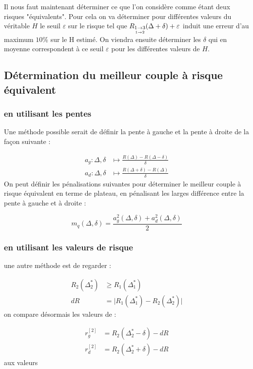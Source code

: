 Il nous faut maintenant déterminer ce que l'on considère comme étant deux risques "équivalents". Pour cela on va déterminer pour différentes valeurs du véritable $H$ le seuil $\varepsilon$ sur le risque tel que $R_{\underset{1 \rightarrow 2}{1 \rightarrow 3}}(\Delta + \delta) + \varepsilon$ induit une erreur d'au maximum $10$\% sur le H estimé. On viendra ensuite déterminer les $\delta$ qui en moyenne correspondent à ce seuil $\varepsilon$ pour les différentes valeurs de $H$.

\subsection{Détermination du meilleur couple à risque \og équivalent \fg}

\subsubsection{en utilisant les pentes}


Une méthode possible serait de définir la pente à gauche et la pente à droite de la façon suivante :

\begin{align*}
	a_g : \Delta, \delta & \mapsto \frac{R(\Delta) - R(\Delta - \delta)}{\delta} \\
	a_d : \Delta, \delta & \mapsto \frac{R(\Delta + \delta) - R(\Delta)}{\delta}
\end{align*}
On peut définir les pénalisations suivantes pour déterminer le meilleur couple à risque équivalent en terme de plateau, en pénalisant les larges différence entre la pente à gauche et à droite :

\begin{equation*}
	m_q(\Delta, \delta) = \frac{a_g^2(\Delta, \delta) + a_d^2(\Delta, \delta)}{2}
\end{equation*}

\subsubsection{en utilisant les valeurs de risque}
une autre méthode est de regarder :

\begin{align*}
	R_2(\Delta^*_2) & \geq R_1(\Delta^*_1)                                      \\
	dR              & = \bigl\vert R_1(\Delta^*_1) - R_2(\Delta^*_2) \bigr\vert
\end{align*}
on compare désormais les valeurs de :

\begin{align*}
	r_g^{[2]} & = R_2(\Delta^*_2 - \delta) - dR \\
	r_d^{[2]} & = R_2(\Delta^*_2 + \delta) - dR
\end{align*}
aux valeurs


